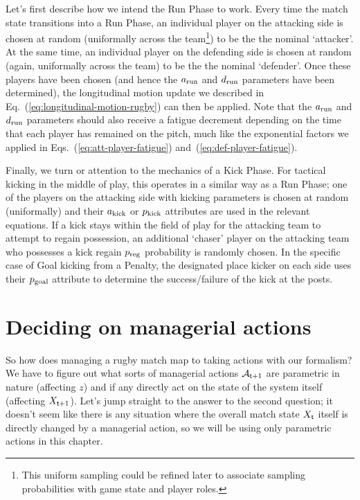 Let's first describe how we intend the {\sf Run Phase} to work. Every time the match state transitions into a {\sf Run Phase}, an individual player on the attacking side is chosen at random (uniformally across the team\footnote{This uniform sampling could be refined later to associate sampling probabilities with game state and player roles.}) to be the the nominal `attacker'. At the same time, an individual player on the defending side is chosen at random (again, uniformally across the team) to be the the nominal `defender'. Once these players have been chosen (and hence the $a_{\rm run}$ and $d_{\rm run}$ parameters have been determined), the longitudinal motion update we described in Eq.~(\ref{eq:longitudinal-motion-rugby}) can then be applied. Note that the $a_{\rm run}$ and $d_{\rm run}$ parameters should also receive a fatigue decrement depending on the time that each player has remained on the pitch, much like the exponential factors we applied in Eqs.~(\ref{eq:att-player-fatigue}) and~(\ref{eq:def-player-fatigue}).

Finally, we turn or attention to the mechanics of a {\sf Kick Phase}. For tactical kicking in the middle of play, this operates in a similar way as a {\sf Run Phase}; one of the players on the attacking side with kicking parameters is chosen at random (uniformally) and their $a_{\rm kick}$ or $p_{\rm kick}$ attributes are used in the relevant equations. If a kick stays within the field of play for the attacking team to attempt to regain possession, an additional `chaser' player on the attacking team who possesses a kick regain $p_{\rm reg}$ probability is randomly chosen. In the specific case of {\sf Goal} kicking from a {\sf Penalty}, the designated place kicker on each side uses their $p_{\rm goal}$ attribute to determine the success/failure of the kick at the posts.

\section{\sffamily Deciding on managerial actions}

So how does managing a rugby match map to taking actions with our formalism? We have to figure out what sorts of managerial actions ${\cal A}_{{\sf t}+1}$ are parametric in nature (affecting $z$) and if any directly act on the state of the system itself (affecting $X_{{\sf t}+1}$). Let's jump straight to the answer to the second question; it doesn't seem like there is any situation where the overall match state $X_{\sf t}$ itself is directly changed by a managerial action, so we will be using only parametric actions in this chapter.

